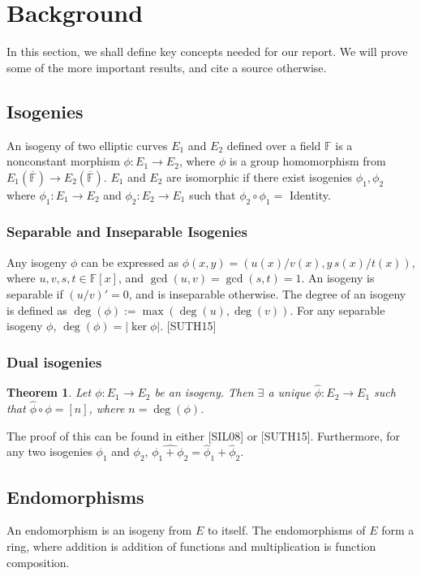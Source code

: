 \documentclass[12pt,twoside]{article}
\newcommand\abs[1]{\left|#1\right|}
\newtheorem{theorem}{Theorem}
\begin{document}
\section{Background}

In this section, we shall define key concepts needed for our report. We will prove some of the more important results, and cite a source otherwise.

\subsection{Isogenies} 
An isogeny of two elliptic curves $E_1$ and $E_2$ defined over a field $\mathbb F$ is a nonconstant morphism $\phi: E_1 \to E_2$, where $\phi$ is a group homomorphism from $E_1(\overline{\mathbb F}) \to E_2(\overline{\mathbb F})$. $E_1$ and $E_2$ are isomorphic if there exist isogenies $\phi_1,\phi_2$ where $\phi_1: E_1 \to E_2$ and $\phi_2: E_2 \to E_1$ such that $\phi_2 \circ \phi_1 =  $ Identity.

\subsubsection{Separable and Inseparable Isogenies}
Any isogeny $\phi$ can be expressed as $\phi(x,y) = ({u(x)}/{v(x)}, y \, {s(x)}/{t(x)})$, where $u,v,s,t \in \mathbb F[x]$, and $\gcd(u,v) = \gcd(s,t) = 1$.
An isogeny is separable if $({u}/{v})' = 0$, and is inseparable otherwise. The degree of an isogeny is defined as $\deg(\phi) := \max(\deg(u), \deg(v))$.
For any separable isogeny $\phi$, $\deg(\phi) = \abs{ \ker \phi}$. [SUTH15]

\subsubsection{Dual isogenies}
\begin{theorem}
Let $\phi: E_1 \to E_2$ be an isogeny. Then $\exists$ a unique $\hat{\phi}: E_2 \to E_1$ such that $\hat \phi \circ \phi = [n]$, where $n = \deg(\phi)$.
\end{theorem}
\noindent The proof of this can be found in either [SIL08] or [SUTH15]. Furthermore, for any two isogenies $\phi_1$ and $\phi_2$, $\widehat{\phi_1 + \phi_2} = \hat \phi_1 + \hat \phi_2$.
\subsection{Endomorphisms}

An endomorphism is an isogeny from $E$ to itself. The endomorphisms of $E$ form a ring, where addition is addition of functions and multiplication is function composition.
\end{document}

